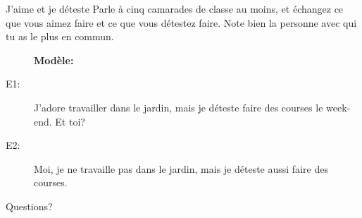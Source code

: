 \documentclass{beamer}
\begin{document}
  \begin{frame}{J'aime et je déteste}
    Parle à cinq camarades de classe au moins, et échangez ce que vous aimez faire et ce que vous détestez faire.
    Note bien la personne avec qui tu as le plus en commun. \\
    \begin{center}
      \begin{description}
        \item[] \textbf{Modèle:}
        \item[E1:] J'adore travailler dans le jardin, mais je déteste faire des courses le week-end. Et toi?
        \item[E2:] Moi, je ne travaille pas dans le jardin, mais je déteste aussi faire des courses.
      \end{description}
    \end{center}
  \end{frame}

  \begin{frame}{}
    \begin{center}
      \Large Questions?
    \end{center}
  \end{frame}
\end{document}
